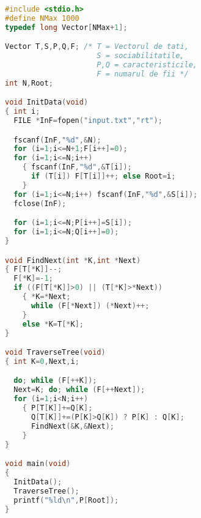 \begin{lstlisting}[language=C]
#include <stdio.h>
#define NMax 1000
typedef long Vector[NMax+1];

Vector T,S,P,Q,F; /* T = Vectorul de tati,
                     S = sociabilitatile,
                     P,Q = caracteristicile,
                     F = numarul de fii */
int N,Root;

void InitData(void)
{ int i;
  FILE *InF=fopen("input.txt","rt");

  fscanf(InF,"%d",&N);
  for (i=1;i<=N+1;F[i++]=0);
  for (i=1;i<=N;i++)
    { fscanf(InF,"%d",&T[i]);
      if (T[i]) F[T[i]]++; else Root=i;
    }
  for (i=1;i<=N;i++) fscanf(InF,"%d",&S[i]);
  fclose(InF);

  for (i=1;i<=N;P[i++]=S[i]);
  for (i=1;i<=N;Q[i++]=0);
}

void FindNext(int *K,int *Next)
{ F[T[*K]]--;
  F[*K]=-1;
  if ((F[T[*K]]>0) || (T[*K]>*Next))
    { *K=*Next;
      while (F[*Next]) (*Next)++;
    }
    else *K=T[*K];
}

void TraverseTree(void)
{ int K=0,Next,i;

  do; while (F[++K]);
  Next=K; do; while (F[++Next]);
  for (i=1;i<N;i++)
    { P[T[K]]+=Q[K];
      Q[T[K]]+=(P[K]>Q[K]) ? P[K] : Q[K];
      FindNext(&K,&Next);
    }
}

void main(void)
{
  InitData();
  TraverseTree();
  printf("%ld\n",P[Root]);
}
\end{lstlisting}
